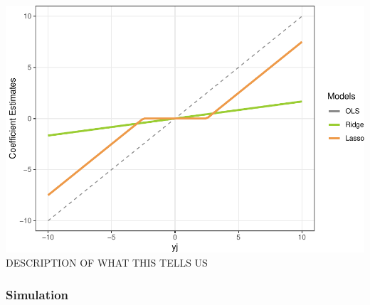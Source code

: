 \documentclass[
]{article}
\begin{document}
\includegraphics{Final-Project_files/figure-latex/unnamed-chunk-1-1.pdf}
DESCRIPTION OF WHAT THIS TELLS US

\hypertarget{simulation}{%
\subsubsection{Simulation}\label{simulation}}
\end{document}
